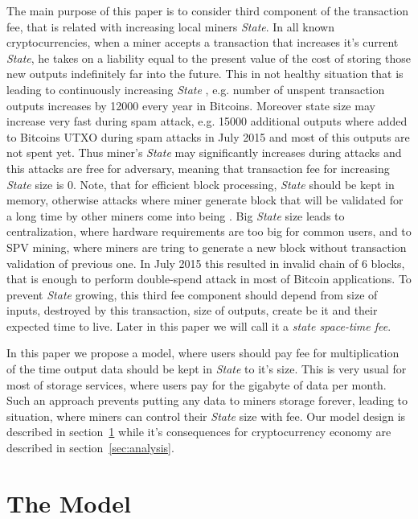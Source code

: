 \documentclass[]{article}   %
\newcommand{\authnote}[2]{\marginpar{\parbox{\marginparwidth}{\tiny %
  \textsf{#1 {\textcolor{blue}{notes: #2}}}}}%
  \textcolor{blue}{\textbf{\dag}}}
\newcommand{\authnote}[2]{
  \textsf{#1 \textcolor{blue}{: #2}}}
\newcommand{\authnote}[2]{}
\newcommand{\dnote}[1]{{\authnote{\textcolor{blue}{Dima notes}}{#1}}}
\newcommand{\state}{\textit{State}}
\begin{document}
The main purpose of this paper is to consider third component of the transaction fee, that is related with increasing local miners \state{}. In all known cryptocurrencies, when a miner accepts a transaction that increases it's current \state{}, he takes on a liability equal to the present value of the cost of storing those new outputs indefinitely far into the future. This in not healthy situation that is leading to continuously increasing \state{} \cite{utxoChart}, e.g. number of unspent transaction outputs increases by 12000 every year in Bitcoins. Moreover state size may increase very fast during spam attack, e.g. 15000 additional outputs where added to Bitcoins UTXO during spam attacks in July 2015 \cite{bitcoin2015flood} and most of this outputs are not spent yet. Thus miner's \state{} may significantly increases during attacks and this attacks are free for adversary, meaning that transaction fee for increasing \state{} size is 0. Note, that for efficient block processing, \state{} should be kept in memory, otherwise attacks where miner generate block that will be validated for a long time by other miners come into being \dnote{link to ethereum DoS, + others?}. Big \state{} size leads to centralization, where hardware requirements are too big for common users, and to SPV mining, where miners are tring to generate a new block without transaction validation of previous one. In July 2015 this resulted in invalid chain of 6 blocks\cite{spvMining}, that is enough to perform double-spend attack in most of Bitcoin applications. To prevent \state{} growing, this third fee component should depend from size of inputs, destroyed by this transaction, size of outputs, create be it and their expected time to live. Later in this paper we will call it a \textit{state space-time fee}.

In this paper we propose a model, where users should pay fee for multiplication of the time output data should be kept in \state{} to it's size. This is very usual for most of storage services, where users pay for the gigabyte of data per month. Such an approach prevents putting any data to miners storage forever, leading to situation, where miners can control their \state{} size with fee. Our model design is described in section~\ref{sec:model} while it's consequences for cryptocurrency economy are described in section~\ref{sec:analysis}.  \dnote{paper structure}

\dnote{write somewhere about lost coins and deflation}

\section{The Model}
\label{sec:model}
\end{document}

